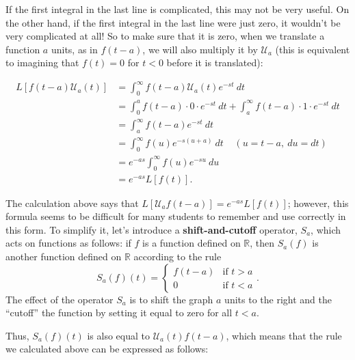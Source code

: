 {If the first integral in the last line is complicated, this may not be very useful.  On the other hand, if the first integral in the last line were just zero, it wouldn't be very complicated at all!  So to make sure that it is zero, when we translate a function $a$ units, as in $f(t-a)$, we will also multiply it by $\mathcal{U}_a$ (this is equivalent to imagining that $f(t)=0$ for $t<0$ before it is translated):


\begin{align*}
L[f(t-a)\mathcal{U}_a(t) ] & = \int_0^\infty f(t-a) \mathcal{U}_a(t) e^{-st} \ dt \\
& = \int_0^a f(t-a)\cdot 0 \cdot e^{-st} \ dt + \int_a^\infty f(t-a) \cdot 1 \cdot e^{-st} \ dt \\
& = \int_a^\infty f(t-a) e^{-st} \ dt \\
& = \int_0^\infty f(u) e^{-s(u+a)} \ dt \ \ \ \ \ (u=t-a, \ du=dt) \\
& = e^{-as} \int_0^\infty f(u) e^{-su} \ du \\
& = e^{-as} L[f(t)].
\end{align*}

The calculation above says that $L[\mathcal{U}_af(t-a)]=e^{-as}L[f(t)]$; however, this formula seems to be difficult for many students to remember and use correctly in this form.  To simplify it, let's introduce a 
	{\bf shift-and-cutoff} operator, $S_a$, which acts on functions as follows: if $f$ is a function defined on $\mathbb{R}$, then $S_a(f)$ is another function defined on $\mathbb{R}$ according to the rule
\[ S_a(f)(t) = \begin{cases} f(t-a) & \mbox{if } t > a \\ 0 & \mbox{if } t < a \end{cases}.\]
The effect of the operator $S_a$ is to shift the graph $a$ units to the right and the ``cutoff'' the function by setting it equal to zero for all $t < a$.  

Thus, $S_a(f)(t)$ is also equal to $\mathcal{U}_a (t) f(t-a)$, which means that the rule we calculated above can be expressed as follows:

{\begin{center}
\end{center}



}}
